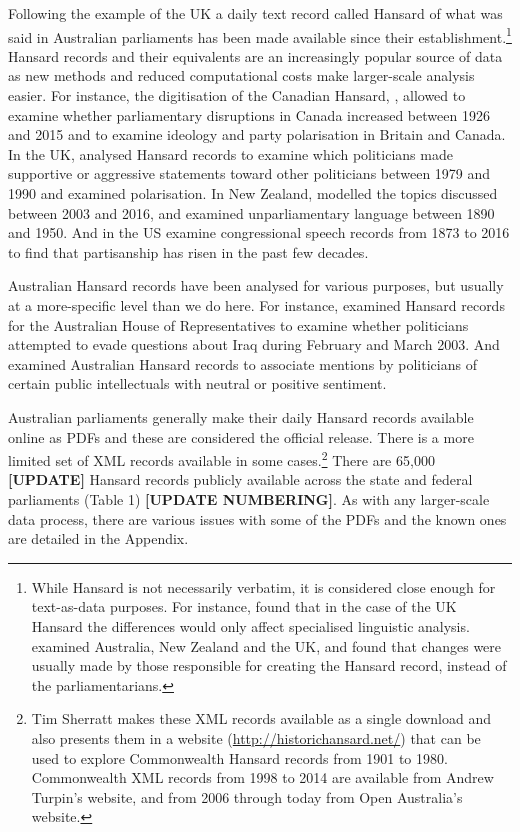 \documentclass[12pt,]{article}
\theoremstyle{definition}
\theoremstyle{definition}
\theoremstyle{definition}
\theoremstyle{remark}
\begin{document}
Following the example of the UK a daily text record called Hansard of
what was said in Australian parliaments has been made available since
their establishment.\footnote{While Hansard is not necessarily verbatim,
  it is considered close enough for text-as-data purposes. For instance,
  \citet{Mollin2008} found that in the case of the UK Hansard the
  differences would only affect specialised linguistic analysis.
  \citet{Edwards2016} examined Australia, New Zealand and the UK, and
  found that changes were usually made by those responsible for creating
  the Hansard record, instead of the parliamentarians.} Hansard records
and their equivalents are an increasingly popular source of data as new
methods and reduced computational costs make larger-scale analysis
easier. For instance, the digitisation of the Canadian Hansard,
\citet{BeelenEtc2017}, allowed \citet{Whyte2017} to examine whether
parliamentary disruptions in Canada increased between 1926 and 2015 and
\citet{RheaultCochran2018} to examine ideology and party polarisation in
Britain and Canada. In the UK, \citet{Duthie2016} analysed Hansard
records to examine which politicians made supportive or aggressive
statements toward other politicians between 1979 and 1990 and
\citet{PetersonSpirling2018} examined polarisation. In New Zealand,
\citet{Curran2017} modelled the topics discussed between 2003 and 2016,
and \citet{Graham2016} examined unparliamentary language between 1890
and 1950. And in the US \citet{GentzkowShapiroTaddy2018} examine
congressional speech records from 1873 to 2016 to find that partisanship
has risen in the past few decades.

Australian Hansard records have been analysed for various purposes, but
usually at a more-specific level than we do here. For instance,
\citet{Rasiah2010} examined Hansard records for the Australian House of
Representatives to examine whether politicians attempted to evade
questions about Iraq during February and March 2003. And
\citet{GansLeigh2012} examined Australian Hansard records to associate
mentions by politicians of certain public intellectuals with neutral or
positive sentiment.

Australian parliaments generally make their daily Hansard records
available online as PDFs and these are considered the official release.
There is a more limited set of XML records available in some
cases.\footnote{Tim Sherratt makes these XML records available as a
  single download and also presents them in a website
  (\url{http://historichansard.net/}) that can be used to explore
  Commonwealth Hansard records from 1901 to 1980. Commonwealth XML
  records from 1998 to 2014 are available from Andrew Turpin's website,
  and from 2006 through today from Open Australia's website.} There are
65,000 \textbf{{[}UPDATE{]}} Hansard records publicly available across
the state and federal parliaments (Table 1) \textbf{{[}UPDATE
NUMBERING{]}}. As with any larger-scale data process, there are various
issues with some of the PDFs and the known ones are detailed in the
Appendix.
\end{document}
